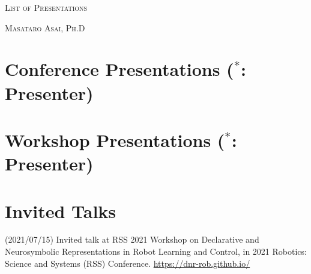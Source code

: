 \documentclass[letterpaper,11pt]{article}
\begin{document}
\pagestyle{empty}

\begin{center}
{\huge\textsc{List of Presentations}}
\vspace{0.7\baselineskip}

{\Large\textsc{Masataro Asai, Ph.D}}
\vspace{0.5\baselineskip}

\small

\end{center}

\section{Conference Presentations ($^*$: Presenter)}

\nocite{Asai2020}
\nocite{Asai2019a}
\nocite{Asai2019b}
\nocite{Asai2018}
\nocite{Asai2017e}
\nocite{Asai2017b}
\nocite{Asai2016b}
\nocite{Asai2016}
\nocite{Asai2015}
\nocite{Asai2014}
\putbib

\section{Workshop Presentations ($^*$: Presenter)}

\nocite{asaiphd}
\nocite{Asai2020b}
\nocite{Asai2016c}
\nocite{Endo2016}
\nocite{Asai2014b}
\putbib

\section{Invited Talks}

(2021/07/15) Invited talk at RSS 2021 Workshop on Declarative and Neurosymbolic Representations in Robot Learning and Control,
in 2021 Robotics: Science and Systems (RSS) Conference. \url{https://dnr-rob.github.io/}
\end{document}

